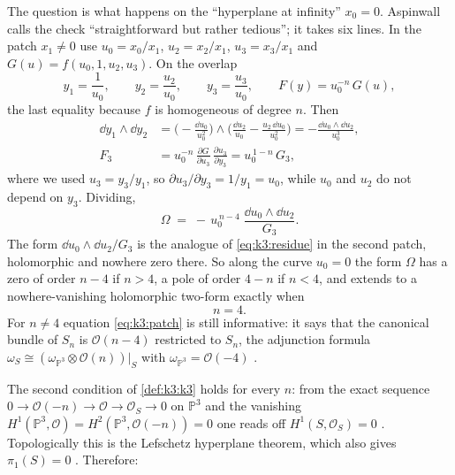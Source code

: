 The question is what happens on the ``hyperplane at infinity'' $x_0=0$. Aspinwall calls the
check ``straightforward but rather tedious''; it takes six lines. In the patch $x_1\neq0$ use
$u_0=x_0/x_1$, $u_2=x_2/x_1$, $u_3=x_3/x_1$ and $G(u)=f(u_0,1,u_2,u_3)$. On the overlap
\begin{equation}
  y_1=\frac1{u_0},\qquad y_2=\frac{u_2}{u_0},\qquad y_3=\frac{u_3}{u_0},
  \qquad F(y)=u_0^{-n}\,G(u),
\end{equation}
the last equality because $f$ is homogeneous of degree $n$. Then
\begin{align}
  \dd y_1\wedge\dd y_2 &= \Big(-\frac{\dd u_0}{u_0^2}\Big)\wedge
      \Big(\frac{\dd u_2}{u_0}-\frac{u_2\,\dd u_0}{u_0^2}\Big)
      = -\frac{\dd u_0\wedge\dd u_2}{u_0^{3}}, \\
  F_3 &= u_0^{-n}\,\frac{\partial G}{\partial u_3}\,\frac{\partial u_3}{\partial y_3}
      = u_0^{\,1-n}\,G_3 ,
\end{align}
where we used $u_3=y_3/y_1$, so $\partial u_3/\partial y_3=1/y_1=u_0$, while $u_0$ and $u_2$
do not depend on $y_3$. Dividing,
\begin{equation}\label{eq:k3:patch}
  \Omega\;=\;-\,u_0^{\,n-4}\;\frac{\dd u_0\wedge\dd u_2}{G_3}.
\end{equation}
The form $\dd u_0\wedge\dd u_2/G_3$ is the analogue of \eqref{eq:k3:residue} in the second
patch, holomorphic and nowhere zero there. So along the curve $u_0=0$ the form $\Omega$ has a
zero of order $n-4$ if $n>4$, a pole of order $4-n$ if $n<4$, and extends to a nowhere-vanishing
holomorphic two-form exactly when
\begin{equation}
  n=4 .
\end{equation}
For $n\neq4$ equation \eqref{eq:k3:patch} is still informative: it says that the canonical
bundle of $S_n$ is $\mathcal{O}(n-4)$ restricted to $S_n$, the adjunction
formula $\omega_{S}\cong(\omega_{\mathbb{P}^3}\otimes
\mathcal{O}(n))|_S$ with $\omega_{\mathbb{P}^3}=\mathcal{O}(-4)$ .

The second condition of \cref{def:k3:k3} holds for every $n$: from the exact sequence
$0\to\mathcal{O}(-n)\to\mathcal{O}\to\mathcal{O}_{S}\to0$ on $\mathbb{P}^3$ and the vanishing
$H^1(\mathbb{P}^3,\mathcal{O})=H^2(\mathbb{P}^3,\mathcal{O}(-n))=0$ one reads off
$H^1(S,\mathcal{O}_S)=0$ . Topologically this is
the Lefschetz hyperplane theorem, which also gives $\pi_1(S)=0$ . Therefore:

